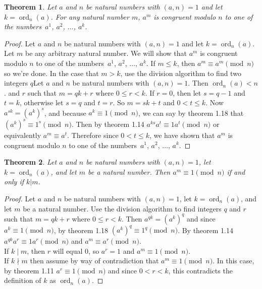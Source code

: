 \documentclass[12pt,leqno]{article}
\numberwithin{equation}{section}
\newtheorem{thm}{Theorem}[section]
\theoremstyle{definition}
\newcommand{\ord}{\operatorname{ord}}
\begin{document}
\pagebreak
\begin{thm}
Let $a$ and $n$ be natural numbers with $(a, n) = 1$ and let $k =
\ord_n(a)$.  For any natural number $m$, $a^m$ is congruent modulo
$n$ to one of the numbers~$a^1$, $a^2$, $\hdots$, $a^k$.
\end{thm}
\begin{proof}[Proof]
Let $a$ and $n$ be natural numbers with $(a, n) = 1$ and let $k = \ord_n(a)$.  Let $m$ be any arbitrary natural number.  We will show that $a^m$ is congruent modulo $n$ to one of the numbers~$a^1$, $a^2$, $\hdots$, $a^k$.  If $m \leq k$, then $a^m \equiv a^m \pmod{n}$ so we're done.  In the case that $m > k$, use the division algorithm to find two integers $q$Let $a$ and $n$ be natural numbers with $(a, n) = 1$. Then
$\ord_n(a) < n$. and $r$ such that $m = qk + r$ where $0 \leq r < k$.  If $r = 0$, then let $s = q - 1$ and $t = k$, otherwise let $s = q$ and $t = r$. So $m = sk + t$ and $0 < t \leq k$.   Now $a^{sk} = (a^k)^s$, and because $a^k \equiv 1 \pmod{n}$, we can say by theorem 1.18 that $(a^k)^s \equiv 1^s \pmod{n}$.  Then by theorem 1.14  $a^{ks}a^t \equiv 1a^t \pmod{n}$ or equivalently $a^m \equiv a^t$.  Therefore since $0 < t \leq k$, we have shown that $a^m$ is congruent modulo $n$ to one of the numbers~$a^1$, $a^2$, $\hdots$, $a^k$.
\end{proof}


\begin{thm}
Let $a$ and $n$ be natural numbers with $(a, n) = 1$, let $k =
\ord_n(a)$, and let $m$ be a natural number.  Then $a^m \equiv 1
\pmod{n}$ if and only if $k|m$.
\end{thm}
\begin{proof}[Proof]
Let $a$ and $n$ be natural numbers with $(a, n) = 1$, let $k = \ord_n(a)$, and let $m$ be a natural number.  Use the division algorithm to find integers $q$ and $r$ such that $m = qk + r$ where $0 \leq r < k$.  Then $a^{qk} = (a^k)^q$ and since $a^k \equiv 1 \pmod{n}$,  by theorem 1.18 $(a^k)^q \equiv 1^q \pmod{n}$.  By theorem 1.14  $a^{qk}a^r \equiv 1a^r \pmod{n}$ and $a^m \equiv a^r \pmod{n}$.\\

 
If $k \mid m$, then $r$ will equal $0$, so $a^r = 1$ and $a^m \equiv 1 \pmod{n}$.\\

If $k \nmid m$ then assume by way of contradiction that $a^m \equiv 1 \pmod{n}$.  In this case, by theorem 1.11 $a^r \equiv 1 \pmod{n}$ and since $0 < r < k$, this contradicts the definition of $k$ as $\ord_n(a)$.
\end{proof}
\end{document}
